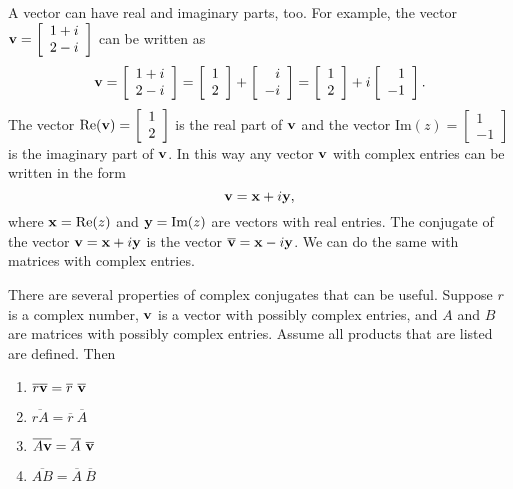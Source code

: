 
A vector can have real and imaginary parts, too. For example, the vector $\mathbf{v} = \left[ \begin{array}{c} 1+i \\ 2-i \end{array} \right]$ can be written as 
\[\mathbf{v} = \left[ \begin{array}{c} 1+i \\ 2-i \end{array} \right] = \left[ \begin{array}{c} 1 \\ 2 \end{array} \right] + \left[ \begin{array}{r} i \\ -i \end{array} \right] = \left[ \begin{array}{c} 1 \\ 2 \end{array} \right] + i\left[ \begin{array}{r} 1 \\ -1 \end{array} \right].\]
The vector $\text{Re}(\mathbf{v}) = \left[ \begin{array}{c} 1 \\ 2 \end{array} \right]$ is the real part of $\mathbf{v}$ and the vector $\text{Im}(z) = \left[ \begin{array}{r} 1 \\ -1 \end{array} \right]$ is the imaginary part of $\mathbf{v}$. In this way any vector $\mathbf{v}$ with complex entries can be written in the form 
\[\mathbf{v} = \mathbf{x} + i \mathbf{y},\]
where $\mathbf{x} = \text{Re}(z)$ and $\mathbf{y} = \text{Im}(z)$ are vectors with real entries. The conjugate of the vector $\mathbf{v} = \mathbf{x} + i \mathbf{y}$ is the vector $\overline{\mathbf{v}} = \mathbf{x} - i \mathbf{y}$. We can do the same with matrices with complex entries. 

There are several properties of complex conjugates that can be useful. Suppose $r$ is a complex number, $\mathbf{v}$ is a vector with possibly complex entries, and $A$ and $B$ are matrices with possibly complex entries. Assume all products that are listed are defined. Then
\begin{enumerate}
\item $\overline{r\vv} = \overline{r} \ \overline{\vv}$ 
\item $\overline{rA} = \overline{r} \ \overline{A}$
\item $\overline{A\vv} = \overline{A} \ \overline{\vv}$ 
\item $\overline{AB} = \overline{A} \ \overline{B}$ 
\end{enumerate}

